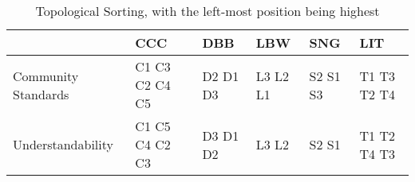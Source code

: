 \begin{table*}
\centering
\caption{Topological Sorting, with the left-most position being highest \label{topologicalResults}}
\begin{tabular}{|| l || l || l || l || l || l ||}
                & CCC           & DBB       & LBW & SNG & LIT \\ \hline
Community Standards     & C1 C3 C2 C4 C5    & D2 D1 D3  &  L3 L2 L1     & S2 S1 S3  & T1 T3 T2 T4 \\
Understandability           & C1 C5 C4 C2 C3    & D3 D1 D2  & L3 L2     & S2 S1     & T1 T2 T4 T3 \\
\end{tabular}
\end{table*}
